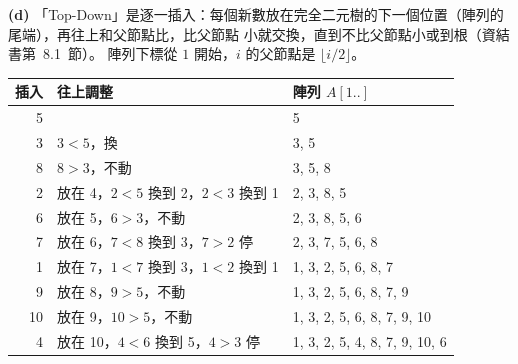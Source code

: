 \begin{pastsoln}
\textbf{(d)} 「Top-Down」是逐一插入：每個新數放在完全二元樹的下一個位置（陣列的尾端），再往上和父節點比，比父節點
小就交換，直到不比父節點小或到根（資結書第~8.1~節）。 陣列下標從 $1$ 開始，$i$ 的父節點是 $\lfloor i/2\rfloor$。

\begin{center}
\small
\begin{tabular}{rll}
\toprule
插入 & 往上調整 & 陣列 $A[1..]$ \\
\midrule
5 & & 5 \\
3 & $3 < 5$，換 & 3, 5 \\
8 & $8 > 3$，不動 & 3, 5, 8 \\
2 & 放在 4，$2 < 5$ 換到 2，$2 < 3$ 換到 1 & 2, 3, 8, 5 \\
6 & 放在 5，$6 > 3$，不動 & 2, 3, 8, 5, 6 \\
7 & 放在 6，$7 < 8$ 換到 3，$7 > 2$ 停 & 2, 3, 7, 5, 6, 8 \\
1 & 放在 7，$1 < 7$ 換到 3，$1 < 2$ 換到 1 & 1, 3, 2, 5, 6, 8, 7 \\
9 & 放在 8，$9 > 5$，不動 & 1, 3, 2, 5, 6, 8, 7, 9 \\
10 & 放在 9，$10 > 5$，不動 & 1, 3, 2, 5, 6, 8, 7, 9, 10 \\
4 & 放在 10，$4 < 6$ 換到 5，$4 > 3$ 停 & 1, 3, 2, 5, 4, 8, 7, 9, 10, 6 \\
\bottomrule
\end{tabular}
\end{center}

\begin{center}
\end{center}


\end{pastsoln}

